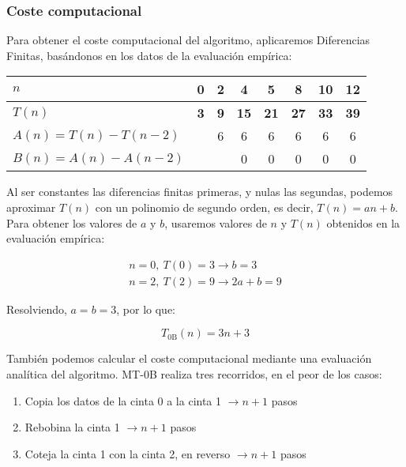 \subsubsection*{Coste computacional}
Para obtener el coste computacional del algoritmo, aplicaremos Diferencias Finitas, basándonos en los datos de la evaluación empírica:

\begin{table}[H]
    \centering
    \begin{tabular}{|l|c|c|c|c|c|c|c|}
        \hline
        $n$ & \textbf{0} & \textbf{2} & \textbf{4} & \textbf{5} & \textbf{8} & \textbf{10} & \textbf{12} \\ \hline
        $T(n)$ & \textbf{3} & \textbf{9} & \textbf{15} & \textbf{21} & \textbf{27} & \textbf{33} & \textbf{39} \\ \hline
        \hline
        $A(n) = T(n) - T(n-2)$ &    &  6 &  6 &  6 &  6 &  6 &  6 \\ \hline
        $B(n) = A(n) - A(n-2)$ &    &    & 0 &  0 &  0 &  0 &  0 \\ \hline
    \end{tabular}
    \label{tab:0B}
\end{table}

Al ser constantes las diferencias finitas primeras, y nulas las segundas, podemos aproximar $T(n)$ con un polinomio de segundo orden, es decir, $T(n) = an + b$.\\

Para obtener los valores de $a$ y $b$, usaremos valores de $n$ y $T(n)$ obtenidos en la evaluación empírica:

\begin{subequations}
    \begin{gather}
        n = 0,\ T(0) = 3 \rightarrow b = 3 \\
        n = 2,\ T(2) = 9 \rightarrow 2a + b = 9
    \end{gather}
\end{subequations}

Resolviendo, $a=b=3$, por lo que:

\begin{equation}
    T_{\mathrm{0B}}(n) = 3n + 3
    \label{eq:Tn0B}
\end{equation}

También podemos calcular el coste computacional mediante una evaluación analítica del algoritmo. MT-0B realiza tres recorridos, en el peor de los casos:
\begin{enumerate}
    \item Copia los datos de la cinta 0 a la cinta 1 $\rightarrow n+1$ pasos
    \item Rebobina la cinta 1 $\rightarrow n+1$ pasos
    \item Coteja la cinta 1 con la cinta 2, en reverso $\rightarrow n+1$ pasos
\end{enumerate}

